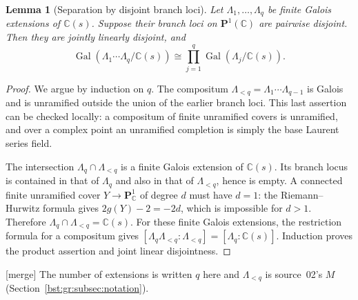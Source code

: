 \documentclass[11pt,letterpaper]{article}
\newtheorem{lemma}[theorem]{Lemma}
\theoremstyle{definition}
\theoremstyle{remark}
\newcommand{\C}{\mathbb C}
\newcommand{\Gal}{\operatorname{Gal}}
\begin{document}
\begin{lemma}[Separation by disjoint branch loci]\label{bst:gr:lem:branches}
Let $\Lambda_1,\ldots,\Lambda_q$ be finite Galois extensions of $\C(s)$.
Suppose their branch loci on $\mathbf P^1(\C)$ are pairwise disjoint. Then
they are jointly linearly disjoint, and
\[
 \Gal(\Lambda_1\cdots\Lambda_q/\C(s))\cong\prod_{j=1}^q\Gal(\Lambda_j/\C(s)).
\]
\end{lemma}
\begin{proof}
We argue by induction on $q$. The compositum
$\Lambda_{<q}=\Lambda_1\cdots\Lambda_{q-1}$ is Galois and is unramified
outside the union of the earlier branch loci. This last assertion can be
checked locally: a compositum of finite unramified covers is unramified, and
over a complex point an unramified completion is simply the base Laurent
series field.

The intersection $\Lambda_q\cap\Lambda_{<q}$ is a finite Galois extension of
$\C(s)$. Its branch locus is contained in that of $\Lambda_q$ and also in
that of $\Lambda_{<q}$, hence is empty. A connected finite unramified cover
$Y\to\mathbf P^1_\C$ of degree $d$ must have $d=1$: the Riemann--Hurwitz
formula gives $2g(Y)-2=-2d$, which is impossible for $d>1$. Therefore
$\Lambda_q\cap\Lambda_{<q}=\C(s)$. For these finite Galois extensions, the
restriction formula for a compositum gives
$[\Lambda_q\Lambda_{<q}:\Lambda_{<q}]=[\Lambda_q:\C(s)]$. Induction proves the
product assertion and joint linear disjointness.
\end{proof}

\textup{[merge]} The number of extensions is written $q$ here and
$\Lambda_{<q}$ is source~02's $M$ (Section~\ref{bst:gr:subsec:notation}).
\end{document}
